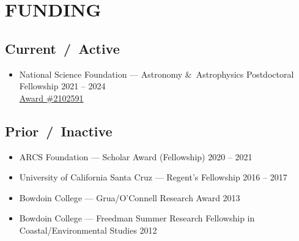 \section*{FUNDING}
\subsection*{\textbf{Current~/~Active}}
\begin{itemize}[leftmargin=0pt,label={},itemsep=1ex]
\item National Science Foundation --- Astronomy \&\ Astrophysics Postdoctoral Fellowship \hfill 2021 -- 2024\\
\href{https://www.nsf.gov/awardsearch/showAward?AWD_ID=2102591&HistoricalAwards=false}{Award \#2102591}
\end{itemize}

\subsection*{\textbf{Prior~/~Inactive}}
\begin{itemize} [leftmargin=0pt,label={},itemsep=1ex]
\item ARCS Foundation --- Scholar Award (Fellowship) \hfill 2020 -- 2021
\item University of California Santa Cruz  --- Regent’s Fellowship \hfill 2016 – 2017
\item Bowdoin College --- Grua/O’Connell Research Award  \hfill 2013
\item Bowdoin College --- Freedman Summer Research Fellowship in Coastal/Environmental Studies \hfill 2012
\end{itemize}